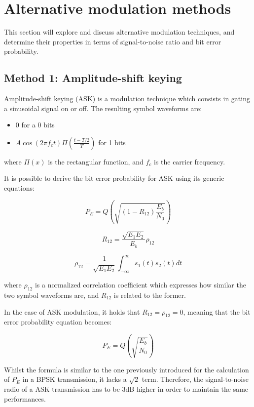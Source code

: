 \section{Alternative modulation methods}
This section will explore and discuss alternative modulation techniques, and determine their properties in terms of signal-to-noise ratio and bit error probability.


\subsection{Method 1: Amplitude-shift keying}
Amplitude-shift keying (ASK) is a modulation technique which consists in gating a sinusoidal signal on or off.
The resulting symbol waveforms are:

\begin{itemize}
	\item $0$ for a 0 bits
	\item $A\cos(2 \pi f_c t) \Pi(\frac{t-T/2}{T})$ for 1 bits
\end{itemize}

where $\Pi(x)$ is the rectangular function, and $f_c$ is the carrier frequency.

It is possible to derive the bit error probability for ASK using its generic equations:

\begin{equation}
	P_E = Q\left(\sqrt{\left(1 - R_{12}\right) \frac{E_b}{N_0}}\right)
\end{equation}

\begin{equation}
	R_{12} = \frac{\sqrt{E_1 E_2}}{E_b}\rho_{12}
\end{equation}

\begin{equation}
	\rho_{12} = \frac{1}{\sqrt{E_1 E_2}} \int_{-\infty}^{\infty} s_1(t) s_2(t) dt
\end{equation}

where $\rho_{12}$ is a normalized correlation coefficient which expresses how similar the two symbol waveforms are, and $R_{12}$ is related to the former.

In the case of ASK modulation, it holds that $R_{12} = \rho_{12} = 0$, meaning that the bit error probability equation becomes:

\begin{equation}
	P_E = Q\left(\sqrt{\frac{E_b}{N_0}}\right)
\end{equation}

Whilst the formula is similar to the one previously introduced for the calculation of $P_E$ in a BPSK transmission, it lacks a $\sqrt{2}$ term.
Therefore, the signal-to-noise radio of a ASK transmission has to be 3dB higher in order to maintain the same performances.

